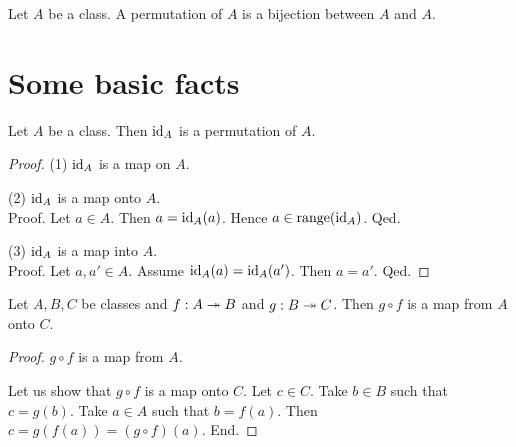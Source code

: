 \documentclass[../../set-theory/set-theory.tex]{subfiles}
\begin{document}
  \begin{forthel}
    \begin{definition}
      Let $A$ be a class.
      A permutation of $A$ is a bijection between $A$ and $A$.
    \end{definition}
  \end{forthel}


  \section{Some basic facts}

  \begin{forthel}
    \begin{proposition}
      Let $A$ be a class.
      Then $\operatorname{id}_{A}$ is a permutation of $A$.
    \end{proposition}
    \begin{proof}
      (1) $\operatorname{id}_{A}$ is a map on $A$.

      (2) $\operatorname{id}_{A}$ is a map onto $A$. \\
      Proof.
        Let $a \in A$.
        Then $a = \operatorname{id}_{A}(a)$.
        Hence $a \in \operatorname{range}(\operatorname{id}_{A})$.
      Qed.

      (3) $\operatorname{id}_{A}$ is a map into $A$. \\
      Proof.
        Let $a, a' \in A$.
        Assume $\operatorname{id}_{A}(a) = \operatorname{id}_{A}(a')$.
        Then $a = a'$.
      Qed.
    \end{proof}
  \end{forthel}

  \begin{forthel}
    \begin{proposition}
      Let $A, B, C$ be classes and $f : A \twoheadrightarrow B$ and $g : B \twoheadrightarrow C$.
      Then $g \circ f$ is a map from $A$ onto $C$.
    \end{proposition}
    \begin{proof}
      $g \circ f$ is a map from $A$.

      Let us show that $g \circ f$ is a map onto $C$.
        Let $c \in C$.
        Take $b \in B$ such that $c = g(b)$.
        Take $a \in A$ such that $b = f(a)$.
        Then $c = g(f(a)) = (g \circ f)(a)$.
      End.
    \end{proof}
  \end{forthel}
\end{document}
